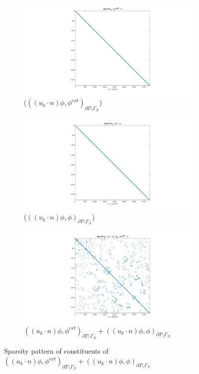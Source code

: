 \documentclass[a4paper,openany]{book}
\begin{document}
\begin{figure}[H]
\begin{subfigure}{\textwidth}
\centering
  \includegraphics[width=\linewidth]{figure81.jpg}
  \caption{($((u_k \cdot n)\phi,\phi^{ext})_{\partial T \setminus \Gamma_N}$)}
  \label{figure_81}
\end{subfigure}
\begin{subfigure}{\textwidth}	
\centering
  \includegraphics[width=\linewidth]{figure82.jpg}
  \caption{($((u_k \cdot n)\phi,\phi)_{\partial T \setminus \Gamma_N}$)}
  \label{figure_82}
\end{subfigure}
\begin{subfigure}{\textwidth}	
\centering
  \includegraphics[width=\linewidth]{figure8.jpg}
  \caption{$((u_k \cdot n)\phi,\phi^{ext})_{\partial T \setminus \Gamma_N} + ((u_k \cdot n)\phi,\phi)_{\partial T \setminus \Gamma_N}$}
  \label{figure_8}
\end{subfigure}
\caption{Sparsity pattern of constituents of $((u_k \cdot n)\phi,\phi^{ext})_{\partial T \setminus \Gamma_N} + ((u_k \cdot n)\phi,\phi)_{\partial T \setminus \Gamma_N}$}
\label{figure_8_all}
\end{figure}
\end{document}
